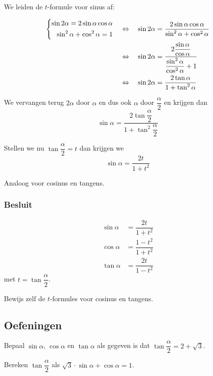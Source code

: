 \documentclass[a4paper,12pt]{article}
\begin{document}
We leiden de $t$-formule voor sinus af:

\begin{align*}
  \left\{\begin{aligned}\sin 2\alpha = 2\sin\alpha\cos\alpha\\\sin^2\alpha + \cos^2\alpha = 1\end{aligned}\right. \quad
  &\Leftrightarrow\quad \sin 2\alpha = \dfrac{2\sin\alpha\cos\alpha}{\sin^2\alpha + \cos^2\alpha}\\
  &\Leftrightarrow\quad \sin 2\alpha = \dfrac{2\dfrac{\sin\alpha}{\cos\alpha}}{\dfrac{\sin^2\alpha}{\cos^2\alpha}+1}\\
  &\Leftrightarrow\quad \sin 2\alpha = \dfrac{2\tan\alpha}{1+\tan^2\alpha}
\end{align*}

We vervangen terug $2\alpha$ door $\alpha$ en dus ook $\alpha$ door $\dfrac{\alpha}{2}$ en krijgen dan
$$\sin\alpha = \dfrac{2\tan\dfrac{\alpha}{2}}{1+\tan^2\dfrac{\alpha}{2}}$$

Stellen we nu $\tan\dfrac{\alpha}{2}=t$ dan krijgen we
$$\sin\alpha = \dfrac{2t}{1+t^2}$$

Analoog voor cosinus en tangens.

\subsubsection*{Besluit}
\begin{align*}
  \sin\alpha &= \dfrac{2t}{1+t^2}\\
  \cos\alpha &= \dfrac{1-t^2}{1+t^2}\\
  \tan\alpha &= \dfrac{2t}{1-t^2}
\end{align*}
met $t=\tan \dfrac{\alpha}{2}$.

\begin{oefening}
Bewijs zelf de $t$-formules voor cosinus en tangens.
\end{oefening}

\subsection{Oefeningen}

\begin{oefening}
Bepaal $\sin\alpha$, $\cos\alpha$ en $\tan\alpha$ als gegeven is dat $\tan\dfrac{\alpha}{2}=2+\sqrt{3}$.
\end{oefening}

\begin{oefening}
Bereken $\tan\dfrac{\alpha}{2}$ als $\sqrt{3}\cdot\sin\alpha+\cos\alpha=1$.
\end{oefening}
\end{document}
